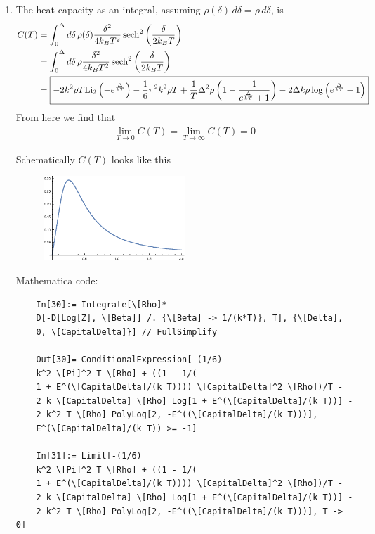 \documentclass{article}
\theoremstyle{definition}
\newcommand{\f}[2]{\frac{#1}{#2}}
\newcommand{\lp}{\left(}
\newcommand{\rp}{\right)}
\begin{document}
\begin{enumerate}[label=(\alph*)]
	\item The heat capacity as an integral, assuming $\rho(\delta)\,d\delta = \rho \,d\delta$, is 
	\begin{align*}
	C(T) 
	&= \int_0^\Delta d\delta\, \rho(\delta) \f{\delta^2}{4k_BT^2}\sech^2\lp \f{\delta}{2k_BT} \rp \\
	&= \int_0^\Delta d\delta\, \rho \f{\delta^2}{4k_BT^2}\sech^2\lp \f{\delta}{2k_BT} \rp \\
	&= \boxed{-2 k^2 \rho  T \text{Li}_2\left(-e^{\frac{\Delta }{k T}}\right)-\frac{1}{6} \pi^2 k^2 \rho  T+\f{1}{T}\Delta ^2 \rho  \left(1-\frac{1}{e^{\frac{\Delta }{kT}}+1}\right)-2 \Delta  k \rho  \log \left(e^{\frac{\Delta }{k T}}+1\right)}
	\end{align*}
	From here we find that
	\begin{align*}
	\boxed{\lim_{T\to 0}C(T) = \lim_{T\to \infty} C(T) = 0}
	\end{align*}
	
	
	
	Schematically $C(T)$ looks like this 
	\begin{figure}[!htb]
		\centering
		\includegraphics[width=0.5\textwidth]{problem10.eps}
	\end{figure}



	Mathematica code:
	\begin{lstlisting}
	In[30]:= Integrate[\[Rho]*
	D[-D[Log[Z], \[Beta]] /. {\[Beta] -> 1/(k*T)}, T], {\[Delta], 
	0, \[CapitalDelta]}] // FullSimplify
	
	Out[30]= ConditionalExpression[-(1/6)
	k^2 \[Pi]^2 T \[Rho] + ((1 - 1/(
	1 + E^(\[CapitalDelta]/(k T)))) \[CapitalDelta]^2 \[Rho])/T - 
	2 k \[CapitalDelta] \[Rho] Log[1 + E^(\[CapitalDelta]/(k T))] - 
	2 k^2 T \[Rho] PolyLog[2, -E^((\[CapitalDelta]/(k T)))], 
	E^(\[CapitalDelta]/(k T)) >= -1]
	
	In[31]:= Limit[-(1/6)
	k^2 \[Pi]^2 T \[Rho] + ((1 - 1/(
	1 + E^(\[CapitalDelta]/(k T)))) \[CapitalDelta]^2 \[Rho])/T - 
	2 k \[CapitalDelta] \[Rho] Log[1 + E^(\[CapitalDelta]/(k T))] - 
	2 k^2 T \[Rho] PolyLog[2, -E^((\[CapitalDelta]/(k T)))], T -> 0]
	

\end{lstlisting}
\end{enumerate}
\end{document}
